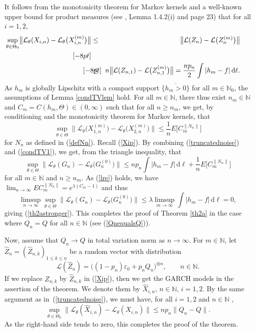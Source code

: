 \documentclass[number,citesort,seceqn,dvips]{arxbj}
\newcommand{\eqref}[1]{(\ref{#1})}
\newcommand{\NN}{\mathbb{N}}
\newcommand{\LLL}{{\mathcal L}}
\begin{document}
It follows from the monotonicity theorem for Markov kernels and a
well-known upper bound for product measures (see \cite{Re93}, Lemma 1.4.2(i)
and page 23) that for all \mbox{$i=1,2$},
%
\begin{eqnarray}\label{truncatednoise}
\hspace*{-15pt}\sup_{\theta\in\Theta_0}\bigl\|\LLL_\theta(X_{i,n})-\LLL
_\theta\bigl(X^{(m)}_{i,n}\bigr)\bigr\|
&\le& \bigl\|\LLL(Z_{n})-\LLL\bigl(Z^{(m)}_n\bigr)\bigr\|\nonumber\\ [-8pt]\\ [-8pt]
\hspace*{-15pt}&\le&
n\bigl\|\LLL(Z_{n,1})-\LLL\bigl(Z^{(m)}_{n,1}\bigr)\bigr\|= \frac{n
p_n}2 \int|h_m-f|\,\mathrm{d}\ell .\nonumber
\end{eqnarray}
%
As $h_m$ is globally Lipschitz with a compact support
$\overline{\{h_m>0\}}$ for all $m\in\NN_0$, the assumptions of
Lemma \ref{condTVlem} hold. For all $m\in\NN$, there thus exist
$n_m\in\NN$ and $C_m=C(h_m,\Theta)\in(0,\infty)$ such that for all
$n\ge n_m$, we get, by conditioning and the monotonicity theorem for
Markov kernels, that
%
\begin{equation}\label{condTV1}
\sup_{\theta\in\Theta}\bigl\|\LLL_\theta
\bigl(X^{(m)}_{1,n}\bigr)-\LLL_\theta\bigl(X^{(m)}_{2,n}\bigr)\bigr\| \le \frac
1n  E \bigl[C_m^{\|N_n\|} \bigr]
\end{equation}
%
for $N_n$ as defined in \eqref{defNn}. Recall \eqref{Xip}. By combining
\eqref{truncatednoise} and \eqref{condTV1}, we get, from the triangle
inequality, that
%
\[
\sup_{\theta\in\Theta} \bigl\|\LLL_\theta(G_n)-\LLL_\theta
\bigl(G_n^{(0)}\bigr) \bigr\|
 \le  n p_n \int|h_m-f|\,\mathrm{d}\ell+\frac1n
 E \bigl[C_m^{\|N_n\|} \bigr]
\]
%
for all $m\in\NN$ and $n\ge n_m$. As
\eqref{lre} holds, we have $\lim_{n\to\infty}EC_m^{\|N_n\|}=
e^{\lambda(C_m-1)}$ and thus
%
\[
\limsup_{n\to\infty}\sup_{\theta\in\Theta} \bigl\|\LLL_\theta
(G_n)-\LLL_\theta\bigl(G_n^{(0)}\bigr) \bigr\|
\le\lambda \limsup_{m\to\infty}\int|h_m-f|\,\mathrm{d}\ell=0 ,
\]
%
giving
\eqref{th2astronger}. This completes the proof of Theorem \ref{th2a} in
the case where $Q_n=Q$ for all $n\in\NN$ (see \eqref{QnequalsQ}).

Now, assume that $Q_n\to Q$ in total variation norm as $n\to\infty$.
For $m\in\NN$, let $\widehat Z_n=(\widehat Z_{n,k})_{1\le k\le n}$ be a
random vector with distribution
%
\[
\LLL(\widehat Z_n) =  \bigl((1 - p_n)\varepsilon_0+p_n Q_n
\bigr)^{\otimes n},\qquad   n\in\NN .
\]
%
If we replace $Z_{n,k}$ by $\widehat Z_{n,k}$
in \eqref{Xip}, then we get the GARCH models in the assertion of the
theorem. We denote them by $\widehat X_{i,n}$, $n\in\NN$, $i=1,2$. By
the same argument as in~\eqref{truncatednoise}, we must have, for all
$i=1,2$ and $n\in\NN$ ,
%
\[
\sup_{\theta\in\Theta_0}\|\LLL_\theta(\widehat
{X}_{i,n})-\LLL_\theta(X_{i,n})\|  \le  np_n\|Q_n-Q\| .
\]
%
As the right-hand side tends to zero, this completes the proof of the
theorem.
\end{document}
